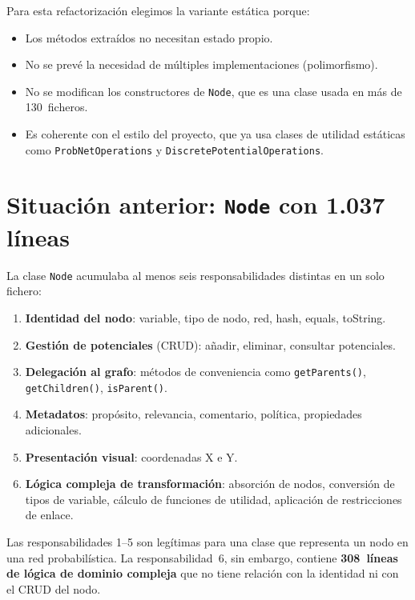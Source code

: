 \documentclass[11pt,a4paper]{article}
\newcommand{\code}[1]{\texttt{#1}}
\begin{document}
Para esta refactorizaci\'on elegimos la variante est\'atica porque:

\begin{itemize}
  \item Los m\'etodos extra\'idos no necesitan estado propio.
  \item No se prev\'e la necesidad de m\'ultiples implementaciones
        (polimorfismo).
  \item No se modifican los constructores de \code{Node}, que es una
        clase usada en m\'as de 130~ficheros.
  \item Es coherente con el estilo del proyecto, que ya usa clases
        de utilidad est\'aticas como \code{ProbNetOperations} y
        \code{DiscretePotentialOperations}.
\end{itemize}

\section{Situaci\'on anterior: \code{Node} con 1.037 l\'ineas}
\label{sec:antes}

La clase \code{Node} acumulaba al menos seis responsabilidades distintas
en un solo fichero:

\begin{enumerate}
  \item \textbf{Identidad del nodo}: variable, tipo de nodo, red, hash,
        equals, toString.
  \item \textbf{Gesti\'on de potenciales} (CRUD): a\~nadir, eliminar,
        consultar potenciales.
  \item \textbf{Delegaci\'on al grafo}: m\'etodos de conveniencia como
        \code{getParents()}, \code{getChildren()}, \code{isParent()}.
  \item \textbf{Metadatos}: prop\'osito, relevancia, comentario,
        pol\'itica, propiedades adicionales.
  \item \textbf{Presentaci\'on visual}: coordenadas X e Y.
  \item \textbf{L\'ogica compleja de transformaci\'on}: absorci\'on de
        nodos, conversi\'on de tipos de variable, c\'alculo de funciones
        de utilidad, aplicaci\'on de restricciones de enlace.
\end{enumerate}

Las responsabilidades 1--5 son leg\'itimas para una clase que representa
un nodo en una red probabil\'istica.  La responsabilidad~6, sin embargo,
contiene \textbf{308~l\'ineas de l\'ogica de dominio compleja} que no
tiene relaci\'on con la identidad ni con el CRUD del nodo.
\end{document}
